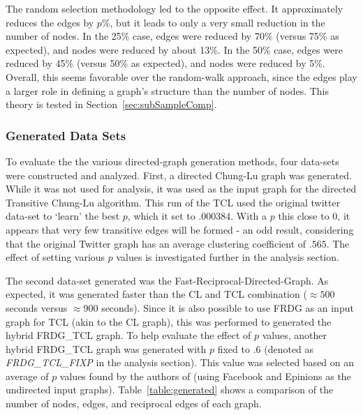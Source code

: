 \documentclass[pdftex,11pt,a4paper,twocolumn]{scrartcl}
\begin{document}
The random selection methodology led to the opposite effect. It approximately reduces the edges by $p\%$, but it leads to only a very small reduction in the number of nodes. In the 25\% case, edges were reduced by 70\% (versus 75\% as expected), and nodes were reduced by about 13\%. In the 50\% case, edges were reduced by 45\% (versus 50\% as expected), and nodes were reduced by 5\%. Overall, this seems favorable over the random-walk approach, since the edges play a larger role in defining a graph's structure than the number of nodes. This theory is tested in Section~\ref{sec:subSampleComp}. 

\subsubsection{Generated Data Sets}

To evaluate the the various directed-graph generation methods, four data-sets were constructed and analyzed. First, a directed Chung-Lu graph was generated. While it was not used for analysis, it was used as the input graph for the directed Transitive Chung-Lu algorithm. This run of the TCL used the original twitter data-set to `learn' the best $p$, which it set to $.000384$. With a $p$ this close to 0, it appears that very few transitive edges will be formed - an odd result, considering that the original Twitter graph has an average clustering coefficient of $.565$. The effect of setting various $p$ values is investigated further in the analysis section. 

The second data-set generated was the Fast-Reciprocal-Directed-Graph. As expected, it was generated faster than the CL and TCL combination ($\approx 500$ seconds versus $\approx 900$ seconds). Since it is also possible to use FRDG as an input graph for TCL (akin to the CL graph), this was performed to generated the hybrid FRDG\_TCL graph. To help evaluate the effect of $p$ values, another hybrid FRDG\_TCL graph was generated with $p$ fixed to $.6$ (denoted as {\it FRDG\_TCL\_FIXP} in the analysis section). This value was selected based on an average of $p$ values found by the authors of \cite{fgls} (using Facebook and Epinions as the undirected input graphs). Table~\ref{table:generated} shows a comparison of the number of nodes, edges, and reciprocal edges of each graph. 
\end{document}
